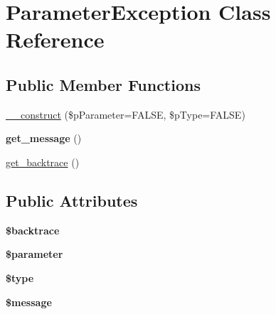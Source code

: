 \hypertarget{class_parameter_exception}{
\section{ParameterException Class Reference}
\label{class_parameter_exception}
}
\subsection*{Public Member Functions}
\begin{DoxyCompactItemize}
\item 
\hyperlink{class_parameter_exception_a284bd312fe650f58a89ff3296deeaafd}{\_\-\_\-construct} (\$pParameter=FALSE, \$pType=FALSE)
\item 
\hypertarget{class_parameter_exception_a7aa167759ac4cf9c8a3bfff9d583226b}{
{\bfseries get\_\-message} ()}
\label{class_parameter_exception_a7aa167759ac4cf9c8a3bfff9d583226b}

\item 
\hyperlink{class_parameter_exception_a225cc8f3a8b6eda97676621f19969bd4}{get\_\-backtrace} ()
\end{DoxyCompactItemize}
\subsection*{Public Attributes}
\begin{DoxyCompactItemize}
\item 
\hypertarget{class_parameter_exception_ab6dab09636641fd407674a91b628ebdc}{
{\bfseries \$backtrace}}
\label{class_parameter_exception_ab6dab09636641fd407674a91b628ebdc}

\item 
\hypertarget{class_parameter_exception_a3260a9c4d9fbf9b7545a878571f7d70a}{
{\bfseries \$parameter}}
\label{class_parameter_exception_a3260a9c4d9fbf9b7545a878571f7d70a}

\item 
\hypertarget{class_parameter_exception_a785913e2dca76e3e6a461aab9c6f402f}{
{\bfseries \$type}}
\label{class_parameter_exception_a785913e2dca76e3e6a461aab9c6f402f}

\item 
\hypertarget{class_parameter_exception_a8adca1855e4c8b96b72e4725aed0b749}{
{\bfseries \$message}}
\label{class_parameter_exception_a8adca1855e4c8b96b72e4725aed0b749}

\end{DoxyCompactItemize}


